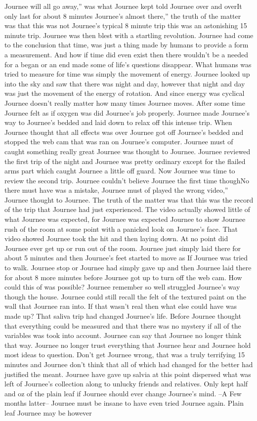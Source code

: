 \documentclass[12pt]{book}
\begin{document}
Journee will all go away,'' was what Journee kept told Journee over and overIt only last for about 8 minutes Journee's almost there,'' the truth of the matter was that this was not Journee's typical 8 minute trip this was an astonishing 15 minute trip. Journee was then blest with a startling revolution. Journee had come to the conclusion that time, was just a thing made by humans to provide a form a measurement. And how if time did even exist then there wouldn't be a needed for a began or an end made some of life's questions disappear. What humans was tried to measure for time was simply the movement of energy. Journee looked up into the sky and saw that there was night and day, however that night and day was just the movement of the energy of rotation. And since energy was cyclical Journee doesn't really matter how many times Journee moves. After some time Journee felt as if oxygen was did Journee's job properly. Journee made Journee's way to Journee's bedded and laid down to relax off this intense trip. When Journee thought that all effects was over Journee got off Journee's bedded and stopped the web cam that was ran on Journee's computer. Journee must of caught something really great Journee was thought to Journee. Journee reviewed the first trip of the night and Journee was pretty ordinary except for the flailed arms part which caught Journee a little off guard. Now Journee was time to review the second trip. Journee couldn't believe Journee the first time thoughNo there must have was a mistake, Journee must of played the wrong video,'' Journee thought to Journee. The truth of the matter was that this was the record of the trip that Journee had just experienced. The video actually showed little of what Journee was expected, for Journee was expected Journee to show Journee rush of the room at some point with a panicked look on Journee's face. That video showed Journee took the hit and then laying down. At no point did Journee ever get up or run out of the room. Journee just simply laid there for about 5 minutes and then Journee's feet started to move as If Journee was tried to walk. Journee stop or Journee had simply gave up and then Journee laid there for about 8 more minutes before Journee got up to turn off the web cam. How could this of was possible? Journee remember so well struggled Journee's way though the house. Journee could still recall the felt of the textured paint on the wall that Journee ran into. If that wasn't real then what else could have was made up? That saliva trip had changed Journee's life. Before Journee thought that everything could be measured and that there was no mystery if all of the variables was took into account. Journee can say that Journee no longer think that way. Journee no longer trust everything that Journee hear and Journee hold most ideas to question. Don't get Journee wrong, that was a truly terrifying 15 minutes and Journee don't think that all of which had changed for the better had justified the meant. Journee have gave up salvia at this point dispersed what was left of Journee's collection along to unlucky friends and relatives. Only kept half and oz of the plain leaf if Journee should ever change Journee's mind. --A Few months latter-- Journee must be insane to have even tried Journee again. Plain leaf Journee may be however 
\end{document}
